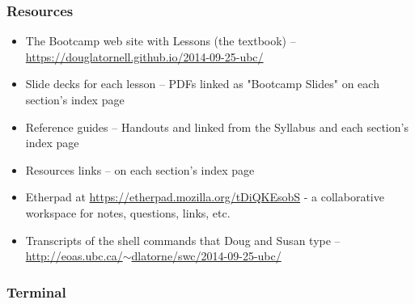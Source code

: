 \documentclass[xcolor=dvipsnames]{beamer}
\begin{document}
\begin{frame}
\frametitle{Resources}
\begin{itemize}
\item The Bootcamp web site with Lessons (the textbook) -- \href{https://douglatornell.github.io/2014-09-25-ubc/}{https://douglatornell.github.io/2014-09-25-ubc/}
\item Slide decks for each lesson -- PDFs linked as "Bootcamp Slides" on each section's index page
\item Reference guides -- Handouts and linked from the Syllabus and each section's index page
\item Resources links -- on each section's index page
\item Etherpad at \href{https://etherpad.mozilla.org/tDiQKEsobS}{https://etherpad.mozilla.org/tDiQKEsobS} - a collaborative workspace for notes, questions, links, etc.
\item Transcripts of the shell commands that Doug and Susan type -- \href{http://eoas.ubc.ca/~dlatorne/swc/2014-09-25-ubc/}{http://eoas.ubc.ca/$\sim$dlatorne/swc/2014-09-25-ubc/}
\end{itemize}
\end{frame}

\begin{frame}
\frametitle{Terminal}
\end{frame}
\end{document}
